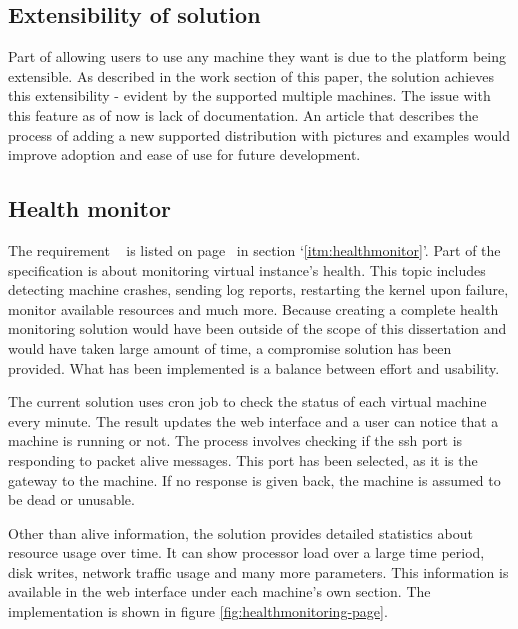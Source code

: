 \documentclass{article}
\begin{document}
\subsection{Extensibility of solution}
Part of allowing users to use any machine they want is due to the platform being extensible. As described in the work section of this paper, the solution achieves this extensibility - evident by the supported multiple machines.
The issue with this feature as of now is lack of documentation. An article that describes the process of adding a new supported distribution with pictures and examples would  improve adoption and ease of use for future development.

\subsection{Health monitor}
The requirement ~  is listed on page~\pageref{itm:healthmonitor} in section `\ref{itm:healthmonitor}'.
Part of the specification is about monitoring virtual instance's health. This topic includes detecting machine crashes, sending log reports, restarting the \gls{kernel} upon failure, monitor available resources and much more. Because creating a complete health monitoring solution would have been outside of the scope of this dissertation and would have taken large amount of time, a compromise solution has been provided. What has been implemented is a balance between effort and usability.

The current solution uses \gls{cron} job to check the status of each virtual machine every minute. The result updates the web interface and a user can notice that a machine is running or not. The process involves checking if the \gls{ssh} port is responding to packet alive messages. This port has been selected, as it is the gateway to the machine. If no response is given back, the machine is assumed to be dead or unusable.

Other than alive information, the solution provides detailed statistics about resource usage over time. It can show processor load over a large time period, disk writes, network traffic usage and many more parameters. This information is available in the web interface under each machine's own section. The implementation is shown in figure \ref{fig:healthmonitoring-page}.
\end{document}
